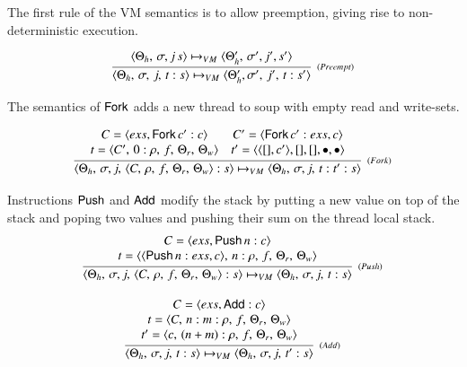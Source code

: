 \documentclass[3p,times,procedia]{elsarticle}
\theoremstyle{definition}
\newcommand{\C}[1]{\red{\mathsf{#1}}}
\begin{document}
The first rule of the VM semantics is to allow preemption, giving rise to non-deterministic execution.

\[
   \infer[_{(Preempt)}]
         {\langle \Theta_h,\,\sigma,\,j,\, t : s \rangle \mapsto_{VM} \langle \Theta_h',\sigma',\,j',\,t : s' \rangle}
         {\langle \Theta_h,\,\sigma,j\,s\rangle \mapsto_{VM} \langle \Theta_h',\,\sigma',j',s'\rangle}
\]

The semantics of \ensuremath{\C{Fork}} adds a new thread to soup with empty read and write-sets.

\[
  \infer[_{(Fork)}]
        { \langle \Theta_h,\,\sigma,j,\,\langle C,\,\rho,\,f,\,\Theta_r,\,\Theta_w\rangle:s\rangle\mapsto_{VM}
          \langle \Theta_h,\,\sigma,j,\,t:t':s\rangle }
        { \begin{array}{cc}
            C = \langle exs, \ensuremath{\C{Fork}}\,c' : c\rangle & C' = \langle \ensuremath{\C{Fork}}\,c' : exs,c\rangle \\
            t = \langle C',\,0:\rho,\,f,\,\Theta_r,\,\Theta_w\rangle & t' = \langle \langle [], c' \rangle, [],[], \bullet,\bullet\rangle \\
          \end{array}}
\]

Instructions \ensuremath{\C{Push}} and \ensuremath{\C{Add}} modify the stack by putting a new value on top of the stack and poping two values and
pushing their sum on the thread local stack.
\[
  \begin{array}{c}
     \infer[_{(Push)}]
           {\langle \Theta_h,\,\sigma,j,\,\langle C,\,\rho,\,f,\,\Theta_r,\,\Theta_w\rangle : s\rangle\mapsto_{VM}
            \langle \Theta_h,\,\sigma,j,\,t : s \rangle}
           {\begin{array}{c}
               C = \langle exs, \ensuremath{\C{Push}}\,n:c\rangle \\
               t = \langle \langle \ensuremath{\C{Push}}\, n : exs, c\rangle ,\,n:\rho,\,f,\,\Theta_r,\,\Theta_w\rangle 
            \end{array}} \\ \\
     \infer[_{(Add)}]
           {\langle \Theta_h,\,\sigma,j,\, t: s\rangle\mapsto_{VM}
            \langle \Theta_h,\,\sigma,j,\,t' : s \rangle}
           {\begin{array}{c}
              C = \langle exs, \ensuremath{\C{Add}} : c \rangle \\
              t = \langle C,\,n:m:\rho,\,f,\,\Theta_r,\,\Theta_w\rangle \\ 
              t' = \langle c,\, (n + m) : \rho,\,f,\,\Theta_r,\,\Theta_w\rangle
            \end{array}} 
  \end{array}
\]
\end{document}
